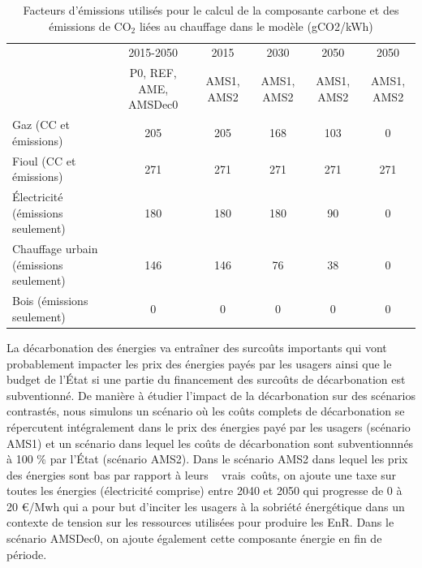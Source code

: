 \documentclass[10.5pt,a4paper]{article}
\begin{document}
{\begin{table}[h!]
\scriptsize
\caption{Facteurs d’émissions utilisés pour le calcul de la composante carbone et des émissions de CO$_2$ liées au chauffage dans le modèle (gCO2/kWh)}
\begin{center}
\begin{tabular}{|l|c|c|c|c|c|}
\hline
																						& 2015-2050							& 2015				& 2030 				& 2050  		 & 2050  \\
																						& P0, REF, AME, AMSDec0 & AMS1, AMS2	& AMS1, AMS2	& AMS1, AMS2 & AMS1, AMS2	\\
\hline
Gaz (CC et émissions) 											& 205										& 205					& 168	 				& 103 			 & 0\\
Fioul	 (CC et émissions)										& 271										& 271					& 271	 				&	271 			 & 271 \\
Électricité	(émissions seulement)						& 180										& 180					& 180  				& 90 				 & 0\\
Chauffage urbain (émissions seulement)	 	  & 146										& 146					&  76	 				& 38 				 & 0\\
Bois (émissions seulement)							  	& 0 										& 0						&  0 					& 0 				 & 0\\
\hline
\end{tabular}
\end{center}
\end{table}


La décarbonation des énergies va entraîner des surcoûts importants qui vont probablement impacter les prix des énergies payés par les usagers ainsi que le budget de l’État si une partie du financement des surcoûts de décarbonation est subventionné.  De manière à étudier l'impact de la décarbonation sur des scénarios contrastés, nous simulons un scénario où les coûts complets de décarbonation se répercutent intégralement dans le prix des énergies payé par les usagers (scénario AMS1) et un scénario dans lequel les coûts de décarbonation sont subventionnnés à 100 \% par l’État (scénario AMS2).  Dans le scénario AMS2 dans lequel les prix des énergies sont bas par rapport à leurs \og~ vrais~\fg coûts, on ajoute une taxe sur toutes les énergies (électricité comprise) entre 2040 et 2050 qui progresse de 0 à 20 €/Mwh qui a pour but d'inciter les usagers à la sobriété énergétique dans un contexte de tension sur les ressources utilisées pour produire les EnR. Dans le scénario AMSDec0, on ajoute également cette composante énergie en fin de période. 

}
\end{document}
